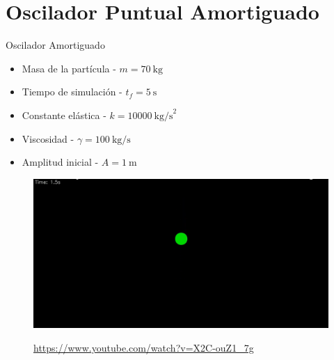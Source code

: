 \section{Oscilador Puntual Amortiguado}\label{sec:ejercicio1}

\begin{frame}{Oscilador Amortiguado}
    \begin{multicols}{2}
        {
        \begin{itemize}
            \item Masa de la partícula - $m = 70\ \text{kg}$
            \item Tiempo de simulación - $t_f = 5\ \text{s}$
            \item Constante elástica - $k = 10000\ \text{kg/s}^2$
            \item Viscosidad - $\gamma = 100\ \text{kg/s}$
            \item Amplitud inicial - $A = 1\ \text{m}$
        \end{itemize}
        }
        {
        \begin{figure}[H]
            \centering
            \includegraphics[width=1\linewidth]{pic/00-ejercicio1/thumbnail}\\
            \captionsetup{labelformat=empty}
            \caption{\href{https://www.youtube.com/watch?v=X2C-ouZ1_7g}{https://www.youtube.com/watch?v=X2C-ouZ1\_7g}}
            \label{fig:oscilador_amortiguado_animation}
        \end{figure}
        }
    \end{multicols}
\end{frame}


